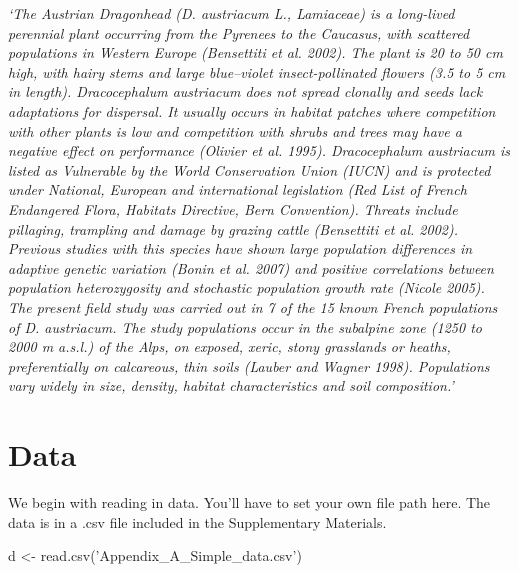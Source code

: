 \documentclass[11pt]{article}
\begin{document}
\emph{`The Austrian Dragonhead (D. austriacum L., Lamiaceae) is a long-lived perennial plant occurring from the Pyrenees to the Caucasus, with scattered populations in Western Europe (Bensettiti et al. 2002). The plant is 20 to 50 cm high, with hairy stems and large blue–violet insect-pollinated flowers (3.5 to 5 cm in length). Dracocephalum austriacum does not spread clonally and seeds lack adaptations for dispersal. It usually occurs in habitat patches where competition with other plants is low and competition with shrubs and trees may have a negative effect on performance (Olivier et al. 1995). Dracocephalum austriacum is listed as Vulnerable by the World Conservation Union (IUCN) and is protected under National, European and international legislation (Red List of French Endangered Flora, Habitats Directive, Bern Convention). Threats include pillaging, trampling and damage by grazing cattle (Bensettiti et al. 2002). Previous studies with this species have shown large population differences in adaptive genetic variation (Bonin et al. 2007) and positive correlations between population heterozygosity and stochastic population growth rate (Nicole 2005). The present field study was carried out in 7 of the 15 known French populations of D. austriacum. The study populations occur in the subalpine zone (1250 to 2000 m a.s.l.) of the Alps, on exposed, xeric, stony grasslands or heaths, preferentially on calcareous, thin soils (Lauber and Wagner 1998). Populations vary widely in size, density, habitat characteristics and soil composition.'}


\section{Data}
\label{sec:Data}

We begin with reading in data. You'll have to set your own file path here. The data is in a .csv file included in the Supplementary Materials.

\begin{Schunk}
\begin{Sinput}
 d <- read.csv('Appendix_A_Simple_data.csv')
\end{Sinput}
\end{Schunk}
\end{document}
